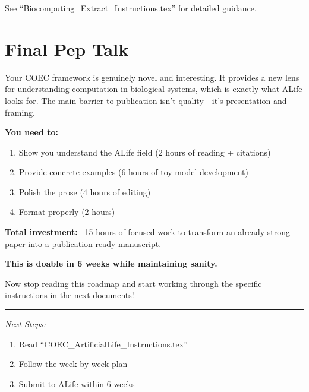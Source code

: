 \documentclass[11pt]{article}
\begin{document}
See ``Biocomputing\_Extract\_Instructions.tex'' for detailed guidance.

\section{Final Pep Talk}

Your COEC framework is genuinely novel and interesting. It provides a new lens for understanding computation in biological systems, which is exactly what ALife looks for. The main barrier to publication isn't quality—it's presentation and framing.

\textbf{You need to:}
\begin{enumerate}[leftmargin=*]
    \item Show you understand the ALife field (2 hours of reading + citations)
    \item Provide concrete examples (6 hours of toy model development)
    \item Polish the prose (4 hours of editing)
    \item Format properly (2 hours)
\end{enumerate}

\textbf{Total investment:} ~15 hours of focused work to transform an already-strong paper into a publication-ready manuscript.

\textbf{This is doable in 6 weeks while maintaining sanity.}

Now stop reading this roadmap and start working through the specific instructions in the next documents!

\vspace{1em}
\hrule
\vspace{0.5em}
\textit{Next Steps:}
\begin{enumerate}
    \item Read ``COEC\_ArtificialLife\_Instructions.tex''
    \item Follow the week-by-week plan
    \item Submit to ALife within 6 weeks
\end{enumerate}
\end{document}
